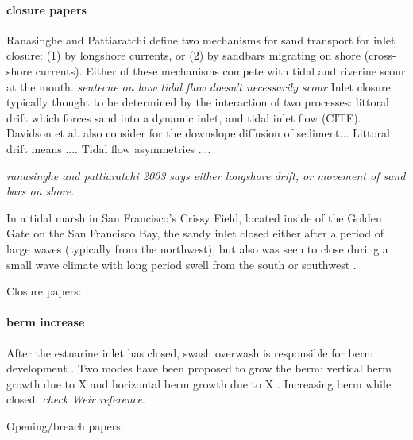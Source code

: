 \paragraph{closure papers} 
Ranasinghe and Pattiaratchi \parencite*{ranasinghe_seasonal_2003} define two mechanisms for sand transport for inlet closure: (1) by longshore currents, or (2) by sandbars migrating on shore (cross-shore currents). Either of these mechanisms compete with tidal and riverine scour at the mouth. \emph{sentecne on how tidal flow doesn't necessarily scour}
Inlet closure typically thought to be determined by the interaction of two processes: littoral drift which forces sand into a dynamic inlet, and tidal inlet flow (CITE). Davidson et al. \parencite*{davidson_simple_2009} also consider for the downslope diffusion of sediment... Littoral drift means .... Tidal flow asymmetries .... 

\emph{ranasinghe and pattiaratchi 2003 says either longshore drift, or movement of sand bars on shore}.

In a tidal marsh in San Francisco's Crissy Field, located inside of the Golden Gate on the San Francisco Bay, the sandy inlet closed either after a period of large waves (typically from the northwest), but also was seen to close during a small wave climate with long period swell from the south or southwest \parencite{hanes_waves_2011}. 

Closure papers: \parencite{ranasinghe_seasonal_2003, elwany_opening_1998, fortunato_morphological_2014, hanes_waves_2011, behrens_characterization_2009, behrens_episodic_2013}.

\paragraph{berm increase}
After the estuarine inlet has closed, swash overwash is responsible for berm development \parencite{baldock_morphodynamic_2008}. Two modes have been proposed to grow the berm: vertical berm growth due to X and horizontal berm growth due to X \parencite{weir_beach_2006}. 
Increasing berm while closed: \parencite{baldock_morphodynamic_2008, laudier_measured_2011, weir_beach_2006} \emph{check Weir reference}. 

Opening/breach papers: \parencite{rich_hydrologic_2013, parkinson_breaching_2007, stretch_breaching_2006, elwany_opening_1998, fortunato_morphological_2014}



